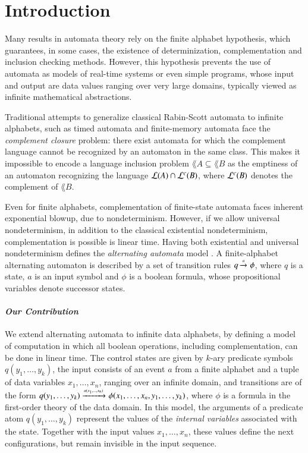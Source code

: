 \section{Introduction}

Many results in automata theory rely on the finite alphabet
hypothesis, which guarantees, in some cases, the existence of
determinization, complementation and inclusion checking
methods. However, this hypothesis prevents the use of automata as
models of real-time systems or even simple programs, whose input and
output are data values ranging over very large domains, typically
viewed as infinite mathematical abstractions.

Traditional attempts to generalize classical Rabin-Scott automata to
infinite alphabets, such as timed automata \cite{AlurDill94} and
finite-memory automata \cite{KaminskiFrancez94} face the
\emph{complement closure} problem: there exist automata for which the
complement language cannot be recognized by an automaton in the same
class. This makes it impossible to encode a language inclusion
problem $\lang{A} \subseteq \lang{B}$ as the emptiness of an automaton
recognizing the language ${\mathcal L}({A}) \cap {\mathcal L}^c({B})$, where ${\mathcal L}^c({B})$
denotes the complement of $\lang{B}$.

Even for finite alphabets, complementation of finite-state automata
faces inherent exponential blowup, due to nondeterminism. However, if
we allow universal nondeterminism, in addition to the classical
existential nondeterminism, complementation is possible is linear
time. Having both existential and universal nondeterminism defines the
\emph{alternating automata} model \cite{ChandraKozenStockmeyer81}. A
finite-alphabet alternating automaton is described by a set of
transition rules $q \xrightarrow{{\scriptscriptstyle a}}_{{\scriptstyle }} \phi$, where $q$ is a state, $a$ is an
input symbol and $\phi$ is a boolean formula, whose propositional
variables denote successor states.

\paragraph{\em Our Contribution}
We extend alternating automata to infinite data alphabets, by defining
a model of computation in which all boolean operations, including
complementation, can be done in linear time.  The control states are
given by $k$-ary predicate symbols $q(y_1,\ldots,y_k)$, the input
consists of an event $a$ from a finite alphabet and a tuple of data
variables $x_1,\ldots,x_n$, ranging over an infinite domain, and
transitions are of the form $q(y_1,\ldots,y_k)
\xrightarrow{{\scriptscriptstyle a(x_1,\ldots,x_n)}}_{{\scriptstyle }} \phi(x_1, \ldots, x_n, y_1, \ldots, y_k)$,
where $\phi$ is a formula in the first-order theory of the data
domain. In this model, the arguments of a predicate atom
$q(y_1,\ldots,y_k)$ represent the values of the \emph{internal
  variables} associated with the state. Together with the input values
$x_1,\ldots,x_n$, these values define the next configurations, but
remain invisible in the input sequence.

